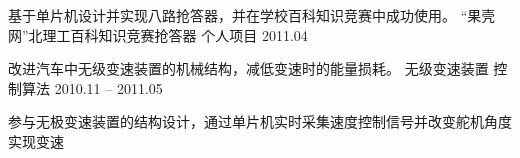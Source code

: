 \begin{cventries}
\cventry
{基于单片机设计并实现八路抢答器，并在学校百科知识竞赛中成功使用。} %
{“果壳网”北理工百科知识竞赛抢答器} %
{个人项目} %
{2011.04 } %
{ %
\begin{cvitems}
\end{cvitems} 
}

\cventry
{改进汽车中无级变速装置的机械结构，减低变速时的能量损耗。} %
{无级变速装置} %
{控制算法} %
{2010.11 -- 2011.05 } %
{ %
\begin{cvitems}
\item{参与无极变速装置的结构设计，通过单片机实时采集速度控制信号并改变舵机角度实现变速}
\end{cvitems} 
}


\end{cventries}